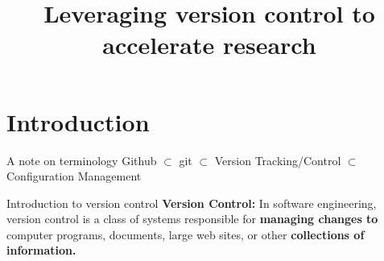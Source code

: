 \documentclass{beamer}
\begin{document}
\title{Leveraging version control to accelerate research}

\graphicspath{{./figs}}
\begin{frame}
  \maketitle

\end{frame}

\begin{frame}
  \tableofcontents
\end{frame}


\section{Introduction}
\begin{frame}{A note on terminology}
  Github $\subset$ git $\subset$ Version Tracking/Control $\subset$ Configuration Management
\end{frame}

\begin{frame}{Introduction to version control}
  \textbf{Version Control:} In software engineering, version control is a class of systems responsible for \textbf{managing changes to} computer programs, documents, large web sites, or other \textbf{collections of information.}
\end{frame}
\end{document}
